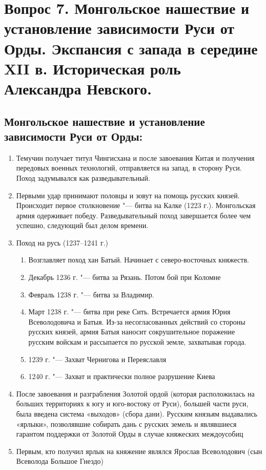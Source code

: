 \section{Вопрос 7. Монгольское нашествие и установление зависимости Руси от Орды. Экспансия с запада в середине XII в. Историческая роль Александра Невского.}

\subsection{Монгольское нашествие и установление зависимости Руси от Орды:}

\begin{enumerate}
    \item{ Темучин получает титул Чингисхана и после завоевания Китая и получения передовых военных технологий, отправляется на запад, в сторону Руси. Поход задумывался как разведывательный.}
    \item{ Первыми удар принимают половцы и зовут на помощь русских князей. Происходит первое столкновение "--- битва на Калке (1223 г.). Монгольская армия одерживает победу. Разведывательный поход завершается более чем успешно, следующий был делом времени.}
    \item{ Поход на русь (1237--1241 г.)
        \begin{enumerate}
            \item{ Возглавляет поход хан Батый. Начинает с северо-восточных княжеств.}
            \item{ Декабрь 1236 г. "--- битва за Рязань. Потом бой при Коломне}
            \item{ Февраль 1238 г. "--- битва за Владимир.}
            \item{ Март 1238 г. "--- битва при реке Сить. Встречается армия Юрия Всеволодовича и Батыя. Из-за несогласованных действий со стороны русских князей, армия Батыя наносит сокрушительное поражение русским войскам и рассыпается по русской земле, захватывая города.}
            \item{ 1239 г. "--- Захват Чернигова и Переяславля}
            \item{ 1240 г. "--- Захват и практически полное разрушение Киева}
        \end{enumerate}
    }
    \item{ После завоевания и разграбления Золотой ордой (которая расположилась на больших территориях к югу и юго-востоку от Руси), большей части руси, была введена система «выходов» (сбора дани). Русским князьям выдавались «ярлыки», позволявшие собирать дань с русских земель и являвшиеся гарантом поддержки от Золотой Орды в случае княжеских междоусобиц}
    \item{ Первым, кто получил ярлык на княжение являлся Ярослав Всеволодович (сын Всеволода Большое Гнездо)}
\end{enumerate}

